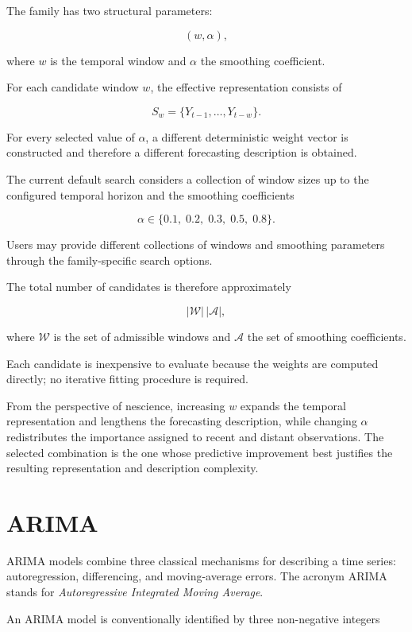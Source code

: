 The family has two structural parameters:

\[
(w,\alpha),
\]

where \(w\) is the temporal window and \(\alpha\) the smoothing coefficient.

For each candidate window \(w\), the effective representation consists of

\[
S_w
=
\{
Y_{t-1},\ldots,Y_{t-w}
\}.
\]

For every selected value of \(\alpha\), a different deterministic weight vector
is constructed and therefore a different forecasting description is obtained.

The current default search considers a collection of window sizes up to the
configured temporal horizon and the smoothing coefficients

\[
\alpha
\in
\{
0.1,\;0.2,\;0.3,\;0.5,\;0.8
\}.
\]

Users may provide different collections of windows and smoothing parameters
through the family-specific search options.

The total number of candidates is therefore approximately

\[
|\mathcal W|
\,|\mathcal A|,
\]

where \(\mathcal W\) is the set of admissible windows and
\(\mathcal A\) the set of smoothing coefficients.

Each candidate is inexpensive to evaluate because the weights are computed
directly; no iterative fitting procedure is required.

From the perspective of nescience, increasing \(w\) expands the temporal
representation and lengthens the forecasting description, while changing
\(\alpha\) redistributes the importance assigned to recent and distant
observations. The selected combination is the one whose predictive improvement
best justifies the resulting representation and description complexity.


%
%

\section{ARIMA}
\label{subsec:automl_arima}

ARIMA models combine three classical mechanisms for describing a time series:
autoregression, differencing, and moving-average errors. The acronym ARIMA
stands for \emph{Autoregressive Integrated Moving Average}.

An ARIMA model is conventionally identified by three non-negative integers

